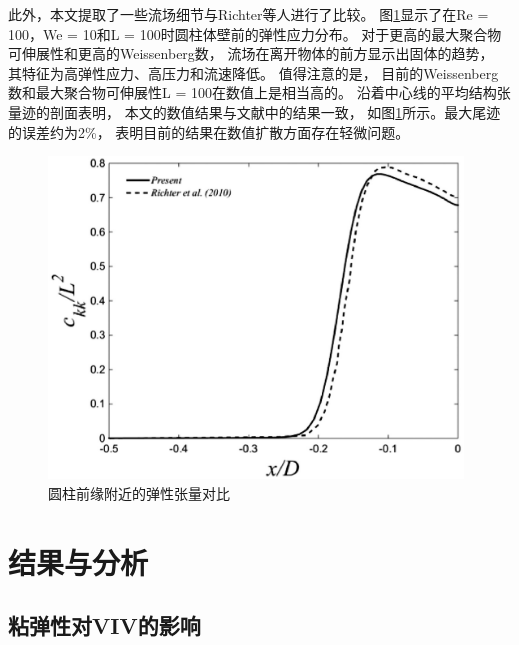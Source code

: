 \documentclass[UTF8,zihao=5]{ctexart} %
\begin{document}
此外，本文提取了一些流场细节与Richter等人进行了比较。
图\ref{fig:4}显示了在Re = 100，We = 10和L = 100时圆柱体壁前的弹性应力分布。
对于更高的最大聚合物可伸展性和更高的Weissenberg数，
流场在离开物体的前方显示出固体的趋势，
其特征为高弹性应力、高压力和流速降低。
值得注意的是，
目前的Weissenberg数和最大聚合物可伸展性L = 100在数值上是相当高的。
沿着中心线的平均结构张量迹的剖面表明，
本文的数值结果与文献中的结果一致，
如图\ref{fig:4}所示。最大尾迹的误差约为2\%，
表明目前的结果在数值扩散方面存在轻微问题。

\begin{figure}[H]
    \centering
    \includegraphics[width=11cm]{fig4.jpg}
    \caption{
        圆柱前缘附近的弹性张量对比}
    \label{fig:4}
\end{figure}


\section{结果与分析}

\subsection{粘弹性对VIV的影响}
\end{document}
